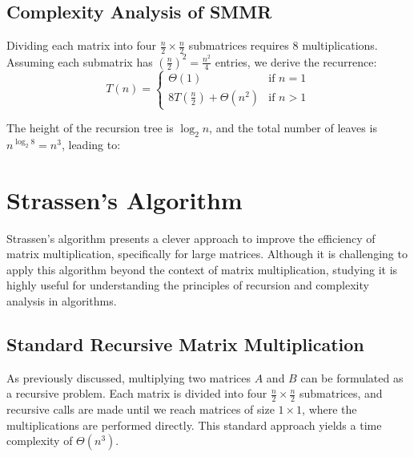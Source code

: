     \subsection{Complexity Analysis of SMMR}
    
    Dividing each matrix into four \( \frac{n}{2} \times \frac{n}{2} \) submatrices requires 8 multiplications. Assuming each submatrix has \( \left(\frac{n}{2}\right)^2 = \frac{n^2}{4} \) entries, we derive the recurrence:
    \[
    T(n) = \begin{cases} 
          \Theta(1) & \text{if } n = 1 \\
          8T\left(\frac{n}{2}\right) + \Theta(n^2) & \text{if } n > 1 
       \end{cases}
    \]
    
    The height of the recursion tree is \(\log_2 n\), and the total number of leaves is \(n^{\log_2 8} = n^3\), leading to:
    
    
    \section{Strassen's Algorithm}
    
    Strassen's algorithm presents a clever approach to improve the efficiency of matrix multiplication, specifically for large matrices. Although it is challenging to apply this algorithm beyond the context of matrix multiplication, studying it is highly useful for understanding the principles of recursion and complexity analysis in algorithms. 
    
    \subsection{Standard Recursive Matrix Multiplication}
    As previously discussed, multiplying two matrices \(A\) and \(B\) can be formulated as a recursive problem. Each matrix is divided into four \( \frac{n}{2} \times \frac{n}{2} \) submatrices, and recursive calls are made until we reach matrices of size \(1 \times 1\), where the multiplications are performed directly. This standard approach yields a time complexity of \(\Theta(n^3)\).
    
